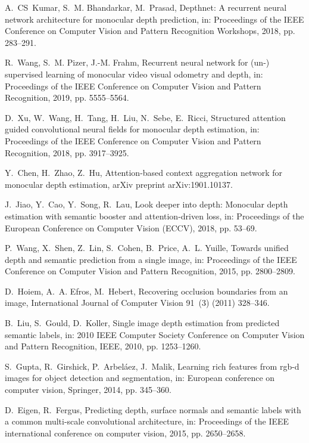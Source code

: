 \documentclass[5p]{elsarticle}
\begin{document}
\begin{thebibliography}{100}
A.~CS~Kumar, S.~M. Bhandarkar, M.~Prasad, Depthnet: A recurrent neural network
  architecture for monocular depth prediction, in: Proceedings of the IEEE
  Conference on Computer Vision and Pattern Recognition Workshops, 2018, pp.
  283--291.

R.~Wang, S.~M. Pizer, J.-M. Frahm, Recurrent neural network for (un-)
  supervised learning of monocular video visual odometry and depth, in:
  Proceedings of the IEEE Conference on Computer Vision and Pattern
  Recognition, 2019, pp. 5555--5564.

D.~Xu, W.~Wang, H.~Tang, H.~Liu, N.~Sebe, E.~Ricci, Structured attention guided
  convolutional neural fields for monocular depth estimation, in: Proceedings
  of the IEEE Conference on Computer Vision and Pattern Recognition, 2018, pp.
  3917--3925.

Y.~Chen, H.~Zhao, Z.~Hu, Attention-based context aggregation network for
  monocular depth estimation, arXiv preprint arXiv:1901.10137.

J.~Jiao, Y.~Cao, Y.~Song, R.~Lau, Look deeper into depth: Monocular depth
  estimation with semantic booster and attention-driven loss, in: Proceedings
  of the European Conference on Computer Vision (ECCV), 2018, pp. 53--69.

P.~Wang, X.~Shen, Z.~Lin, S.~Cohen, B.~Price, A.~L. Yuille, Towards unified
  depth and semantic prediction from a single image, in: Proceedings of the
  IEEE Conference on Computer Vision and Pattern Recognition, 2015, pp.
  2800--2809.

D.~Hoiem, A.~A. Efros, M.~Hebert, Recovering occlusion boundaries from an
  image, International Journal of Computer Vision 91~(3) (2011) 328--346.

B.~Liu, S.~Gould, D.~Koller, Single image depth estimation from predicted
  semantic labels, in: 2010 IEEE Computer Society Conference on Computer Vision
  and Pattern Recognition, IEEE, 2010, pp. 1253--1260.

S.~Gupta, R.~Girshick, P.~Arbel{\'a}ez, J.~Malik, Learning rich features from
  rgb-d images for object detection and segmentation, in: European conference
  on computer vision, Springer, 2014, pp. 345--360.

D.~Eigen, R.~Fergus, Predicting depth, surface normals and semantic labels with
  a common multi-scale convolutional architecture, in: Proceedings of the IEEE
  international conference on computer vision, 2015, pp. 2650--2658.


\end{thebibliography}
\end{document}

